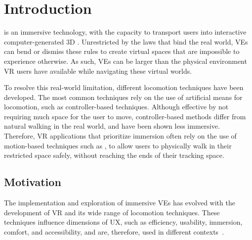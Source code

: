 
%

\chapter{Introduction}     
\label{cha:introduction}

\newcommand{\Overleaf}{\href{https://www.overleaf.com?r=f5160636&rm=d&rs=b}{Overleaf}}

\epigraphfontsize{\small\itshape}
\setlength\epigraphwidth{12.5cm}
\setlength\epigraphrule{0pt}


 is an immersive technology, with the capacity to transport users into interactive computer-generated 3D . Unrestricted 
by the laws that bind the real world, \glspl{VE} can bend or dismiss these rules to create virtual spaces that are impossible to experience otherwise. 
As such, \glspl{VE} can be larger than the physical environment \gls{VR} users have available while navigating these virtual worlds. 

To resolve this real-world limitation, different locomotion techniques have been developed. The most common techniques rely on the use of artificial means for 
locomotion, such as controller-based techniques. Although effective by not requiring much space for the user to move, controller-based methods differ 
from natural walking in the real world, and have been shown less immersive. Therefore,
\gls{VR} applications that prioritize immersion often rely on the use of motion-based techniques such as , to allow users to physically 
walk in their restricted space safely, without reaching the ends of their tracking space. 


\section{Motivation}
\label{sec:Motivation}

The implementation and exploration of immersive \glspl{VE} has evolved with the development of \gls{VR} and its wide 
range of locomotion techniques. 
These techniques influence dimensions of \gls{UX}, such as efficiency, usability, immersion, comfort, and accessibility, and are, 
therefore, used in different contexts~\cite{Boletsis2019}.

